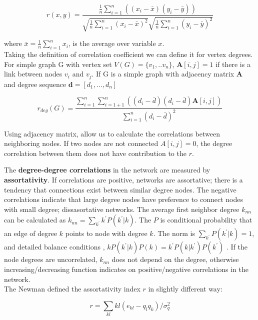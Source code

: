 \begin{equation}
r(x, y) = \frac{\frac{1}{n}\sum_{i=1}^{n}((x_i - \bar{x} ) (y_i - \bar{y}) )}{\sqrt{\frac{1}{n}\sum_{i=1}^{n}(x_i - \bar{x})^2} \sqrt{\frac{1}{n}\sum_{i=1}^{n}(y_i - \bar{y})^2} }
\end{equation}

where $\bar{x} = \frac{1}{n}\sum_{i=1}^{n}x_i$, is the average over variable $x$. \\

Taking the definition of correlation coefficient we can define it for vertex degrees. For simple graph G with vertex set $V(G) = \{v_1, ..v_n\}$, $\boldsymbol{A}[i,j] = 1$ if there is a link between nodes $v_i$ and $v_j$. If G is a simple graph with adjacency matrix $\boldsymbol{A}$ and degree sequence $\boldsymbol{d} = [d_1, ..., d_n]$

\begin{equation}
r_{deg}(G) = \frac{\sum_{i=1}^{n}\sum_{i=1+1}^{n}((d_i - \bar{d}) (d_i - \bar{d}) \boldsymbol{A}[i,j] )}{\sum_{i=1}^{n}(d_i - \bar{d})^2}
\end{equation}

Using adjacency matrix, allow us to calculate the correlations between neighboring nodes. If two nodes are not connected $A[i,j]=0$, the degree correlation between them does not have contribution to the $r$.

The \textbf{degree-degree correlations} in the network are measured by \textbf{assortativity}. If correlations are positive, networks are assortative; there is a tendency that connections exist between similar degree nodes. The negative correlations indicate that large degree nodes have preference to connect nodes with small degree; dissasortative networks. The average first neighbor degree $k_{nn}$ can be calculated as $k_{nn} = \sum_{k^{'}}k^{'}P(k^{'}|{k})$. The $P$ is conditional probability that an edge of degree $k$ points to node with degree $k$. The norm is $\sum_{k^{'}}P(k^{'}|k)=1$, and detailed balance conditions \cite{boccaletti2006complex},  $kP(k^{'}|k)P(k) = k^{'}P(k|k^{'})P(k^{'})$ \cite{boccaletti2006complex}. If the node degrees are uncorrelated, $k_{nn}$ does not depend on the degree, otherwise increasing/decreasing function indicates on positive/negative correlations in the network. \\

The Newman defined the assortativity index $r$ in slightly different way:

\begin{equation}
r = \sum_{kl}kl(e_{kl} - q_lq_k) / \sigma_q^2
\end{equation}


